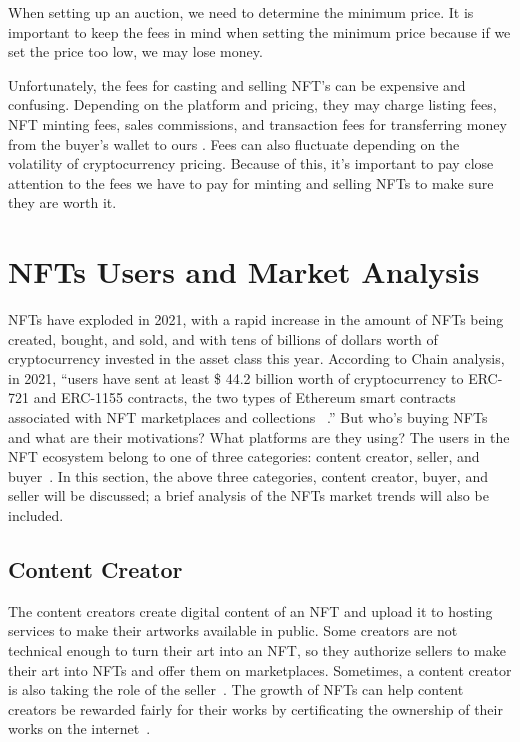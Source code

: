 When setting up an auction, we need to determine the minimum price. It is important to keep the fees in mind when setting the minimum price because if we set the price too low, we may lose money.

Unfortunately, the fees for casting and selling NFT's can be expensive and confusing. Depending on the platform and pricing, they may charge listing fees, NFT minting fees, sales commissions, and transaction fees for transferring money from the buyer's wallet to ours \cite{how2makenfts}. Fees can also fluctuate depending on the volatility of cryptocurrency pricing. Because of this, it's important to pay close attention to the fees we have to pay for minting and selling NFTs to make sure they are worth it.


\section{NFTs Users and Market Analysis}

NFTs have exploded in 2021, with a rapid increase in the amount of NFTs being created, bought, and sold, and with tens of billions of dollars worth of cryptocurrency invested in the asset class this year. According to Chain analysis, in 2021, “users have sent at least \$ 44.2 billion worth of cryptocurrency to ERC-721 and ERC-1155 contracts, the two types of Ethereum smart contracts associated with NFT marketplaces and collections ~\cite{tumblr_team_2022}.” But who’s buying NFTs and what are their motivations? What platforms are they using? The users in the NFT ecosystem belong to one of three categories: content creator, seller, and buyer~\cite{das2022understanding}. In this section, the above three categories, content creator, buyer, and seller will be discussed; a brief analysis of the NFTs market trends will also be included. 


\subsection{Content Creator}
The content creators create digital content of an NFT and upload it to hosting services to make their artworks available in public. Some creators are not technical enough to turn their art into an NFT, so they authorize sellers to make their art into NFTs and offer them on marketplaces. Sometimes, a content creator is also taking the role of the seller~\cite{das2022understanding}. The growth of NFTs can help content creators be rewarded fairly for their works by certificating the ownership of their works on the internet~\cite{isak_2021}.


